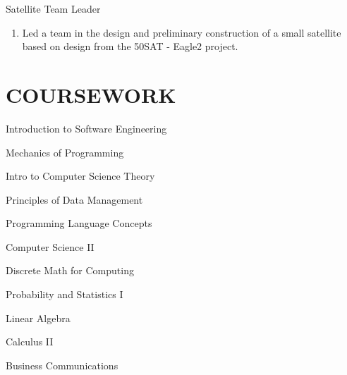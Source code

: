 \documentclass[line, margin]{res}
\begin{document}
\begin{resume}
 Satellite Team Leader
      \begin{enumerate}
        \item[] Led a team in the design and preliminary construction of a small satellite based on design from the \textdollar 50SAT - Eagle2 project.
      \end{enumerate}

\section{COURSEWORK}


      \begin{enumerate*}[series=MyList, before=\hspace{-0.6ex}, label=\textbullet]
        \item Introduction to Software Engineering
        \item Mechanics of Programming
        \item Intro to Computer Science Theory
        \item Principles of Data Management
        \item Programming Language Concepts
        \item Computer Science II
        \item Discrete Math for Computing
        \item Probability and Statistics I
        \item Linear Algebra
        \item Calculus II
        \item Business Communications
      \end{enumerate*}


 
\end{resume}
\end{document}
